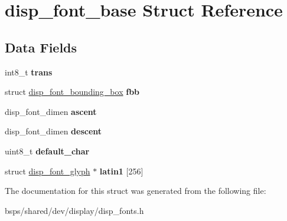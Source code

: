\hypertarget{structdisp__font__base}{}\section{disp\+\_\+font\+\_\+base Struct Reference}
\label{structdisp__font__base}
\subsection*{Data Fields}
\begin{DoxyCompactItemize}
\item 
\mbox{\label{structdisp__font__base_a8c0abfb386613865fc023d9f60e919fc}} 
int8\+\_\+t {\bfseries trans}
\item 
\mbox{\label{structdisp__font__base_af0b32549a9a14abe1ee2f3d2d33f36a1}} 
struct \mbox{\hyperlink{structdisp__font__bounding__box}{disp\+\_\+font\+\_\+bounding\+\_\+box}} {\bfseries fbb}
\item 
\mbox{\label{structdisp__font__base_afde8a7b564ad02547bac539aaa785942}} 
disp\+\_\+font\+\_\+dimen {\bfseries ascent}
\item 
\mbox{\label{structdisp__font__base_a614b0bbda99d181bd10805507226a627}} 
disp\+\_\+font\+\_\+dimen {\bfseries descent}
\item 
\mbox{\label{structdisp__font__base_ac7494df8e7f11650170aa53964d63fad}} 
uint8\+\_\+t {\bfseries default\+\_\+char}
\item 
\mbox{\label{structdisp__font__base_a8298c30bbec3817f3f7effc9ca70618d}} 
struct \mbox{\hyperlink{structdisp__font__glyph}{disp\+\_\+font\+\_\+glyph}} $\ast$ {\bfseries latin1} \mbox{[}256\mbox{]}
\end{DoxyCompactItemize}


The documentation for this struct was generated from the following file\+:\begin{DoxyCompactItemize}
\item 
bsps/shared/dev/display/disp\+\_\+fonts.\+h\end{DoxyCompactItemize}
